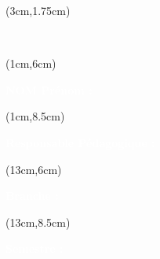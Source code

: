 \begin{titlepage}
    \thispagestyle{empty}

    

    \begin{textblock*}{15cm}(3cm,1.75cm)
        \begin{LARGE}
            \makeatletter
            \justifying

            \begin{center}
                \textbf{\textcolor{white}{\jobposition}}
                \\
                \textbf{\textcolor{white}{\thetitle}}
            \end{center}

            \makeatother
        \end{LARGE}
    \end{textblock*}

    \begin{textblock*}{10cm}(1cm,6cm)
        \begin{flushleft}
            \large
            \textbf{\textcolor{white}{NOM Prénom :}}
            \\
            \textbf{\textcolor{white}{\theauthor}}
        \end{flushleft}
    \end{textblock*}

    \begin{textblock*}{9cm}(1cm,8.5cm)
        \begin{flushleft}
            \large
            \textbf{\textcolor{white}{Responsable Pédagogique :}}
            \\
            \textbf{\textcolor{white}{\theRPeda}}
        \end{flushleft}
    \end{textblock*}


    \begin{textblock*}{7cm}(13cm,6cm)
        \begin{flushleft}
            \large
            \textbf{\textcolor{white}{Branche :}}
            \\
            \textcolor{white}{\theUE}
        \end{flushleft}
    \end{textblock*}

    \begin{textblock*}{7cm}(13cm,8.5cm)
        \begin{flushleft}
            \large
            \textbf{\textcolor{white}{Semestre :}}
            \\
            \textcolor{white}{\theSemestre}
        \end{flushleft}
    \end{textblock*}


\end{titlepage}
